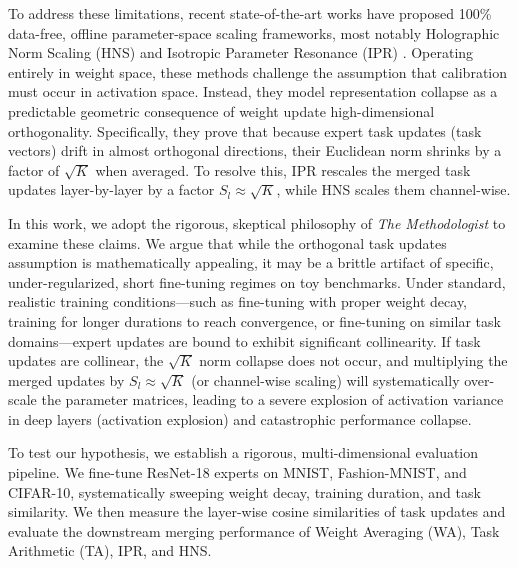 \documentclass{article}
\theoremstyle{plain}
\theoremstyle{definition}
\theoremstyle{remark}
\begin{document}
To address these limitations, recent state-of-the-art works have proposed 100\% data-free, offline parameter-space scaling frameworks, most notably Holographic Norm Scaling (HNS) \cite{Anonymous2026a} and Isotropic Parameter Resonance (IPR) \cite{Anonymous2026b}. Operating entirely in weight space, these methods challenge the assumption that calibration must occur in activation space. 
Instead, they model representation collapse as a predictable geometric consequence of weight update high-dimensional orthogonality. 
Specifically, they prove that because expert task updates (task vectors) drift in almost orthogonal directions, their Euclidean norm shrinks by a factor of $\sqrt{K}$ when averaged. 
To resolve this, IPR rescales the merged task updates layer-by-layer by a factor $S_l \approx \sqrt{K}$, while HNS scales them channel-wise.

In this work, we adopt the rigorous, skeptical philosophy of \textit{The Methodologist} to examine these claims. We argue that while the orthogonal task updates assumption is mathematically appealing, it may be a brittle artifact of specific, under-regularized, short fine-tuning regimes on toy benchmarks. 
Under standard, realistic training conditions---such as fine-tuning with proper weight decay, training for longer durations to reach convergence, or fine-tuning on similar task domains---expert updates are bound to exhibit significant collinearity. 
If task updates are collinear, the $\sqrt{K}$ norm collapse does not occur, and multiplying the merged updates by $S_l \approx \sqrt{K}$ (or channel-wise scaling) will systematically over-scale the parameter matrices, leading to a severe explosion of activation variance in deep layers (activation explosion) and catastrophic performance collapse.

To test our hypothesis, we establish a rigorous, multi-dimensional evaluation pipeline. We fine-tune ResNet-18 experts on MNIST, Fashion-MNIST, and CIFAR-10, systematically sweeping weight decay, training duration, and task similarity. We then measure the layer-wise cosine similarities of task updates and evaluate the downstream merging performance of Weight Averaging (WA), Task Arithmetic (TA), IPR, and HNS.
\end{document}

